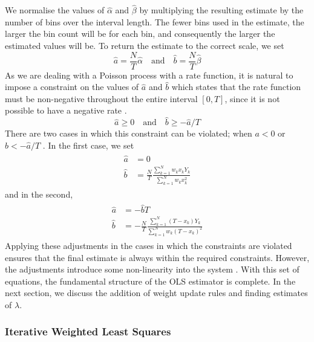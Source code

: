\documentclass[a4paper,11pt,twoside]{article}
\begin{document}
    We normalise the values of $\hat{\alpha}$ and $\hat{\beta}$ by multiplying
    the resulting estimate by the number of bins over the interval length. The
    fewer bins used in the estimate, the larger the bin count will be for each
    bin, and consequently the larger the estimated values will be. To return the
    estimate to the correct scale, we set
    \begin{equation}
    \hat{a}=\frac{N}{T}\hat{\alpha}\quad\text{and}\quad
    \hat{b}=\frac{N}{T}\hat{\beta}
    \end{equation}
    As we are dealing with a Poisson process with a rate function, it is natural
    to impose a constraint on the values of $\hat{a}$ and $\hat{b}$ which states
    that the rate function must be non-negative throughout the entire interval
    $[0,T]$, since it is not possible to have a negative rate
    \cite{massey1996estimating}.
    \begin{equation}
    \hat{a}\geq 0\quad \text{and}\quad
    \hat{b}\geq -\hat{a}/T
    \end{equation}
    There are two cases in which this constraint can be violated; when $a<0$ or
    $b<-\hat{a}/T$ \cite{massey1996estimating}. In the first case, we set
    \begin{align}
    \begin{split}
    \hat{a}&=0\\
    \hat{b}&=\frac{N}{T}\frac{\displaystyle \sum_{k=1}^N w_kx_kY_k}{\displaystyle\sum_{k=1}^N w_kx_k^2}
    \end{split}
    \end{align}
    and in the second,
    \begin{align}
    \begin{split}
    \hat{a}&=-\hat{b}T\\
    \hat{b}&=-\frac{N}{T}\frac{\displaystyle \sum_{k=1}^N (T-x_k)Y_k}{\displaystyle \sum_{k=1}^N w_k(T-x_k)^2}
    \end{split}
    \end{align}
    Applying these adjustments in the cases in which the constraints are
    violated ensures that the final estimate is always within the required
    constraints. However, the adjustments introduce some non-linearity into the
    system \cite{massey1996estimating}. With this set of equations, the
    fundamental structure of the OLS estimator is complete. In the next section,
    we discuss the addition of weight update rules and finding estimates of
    $\lambda$.
\subsubsection{Iterative Weighted Least Squares}
\label{sec-4-1-2}
\end{document}
